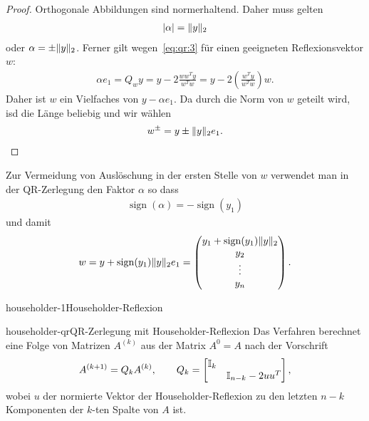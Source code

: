 \begin{proof}
  Orthogonale Abbildungen sind normerhaltend. Daher muss gelten
  \begin{gather}
    \lvert\alpha\rvert = \lVert y\rVert_2
  \end{gather}
  oder $\alpha = \pm\lVert y\rVert_2$.  Ferner gilt
  wegen~\eqref{eq:qr:3} für einen geeigneten Reflexionsvektor $w$:
  \begin{gather}
    \alpha e_1 = Q_{w} y = y-2 \frac{ww^Ty}{w^Tw}
    = y-2\left(\frac{w^Ty}{w^Tw}\right)w.
  \end{gather}
  Daher ist $w$ ein Vielfaches von $y - \alpha e_1$. Da durch die Norm
  von $w$ geteilt wird, isd die Länge beliebig und wir wählen
  \begin{gather}
    w^{\pm} = y\pm \lVert y\rVert_2 e_1.
  \end{gather}
\end{proof}

\begin{remark}
  Zur Vermeidung von Auslöschung in der ersten Stelle von $w$
  verwendet man in der QR-Zerlegung den Faktor $\alpha$ so dass
  \begin{gather}
    \operatorname{sign} (\alpha) = -\operatorname{sign} (y_1)
  \end{gather}
  und damit
  \begin{gather}
    w = y + \operatorname{sign} (y_1) \lVert y\rVert_2 e_1
    =
    \begin{pmatrix}
      y_1 + \operatorname{sign} (y_1) \lVert y\rVert_2\\
      y_2\\\vdots\\y_n
    \end{pmatrix}.
  \end{gather}
\end{remark}

\begin{Algorithmus*}{householder-1}{Householder-Reflexion}
  
\end{Algorithmus*}

\begin{Definition*}{householder-qr}{QR-Zerlegung mit Householder-Reflexion}
  Das Verfahren berechnet eine Folge von Matrizen $A^{(k)}$ aus der
  Matrix $A^{0} = A$ nach der Vorschrift
  \begin{gather}
    A^{(k+1)} = Q_{k} A^{(k)}, \qquad Q_k =
    \begin{bmatrix}
      \mathbb I_k\\& \mathbb I_{n-k}-2uu^T
    \end{bmatrix},
  \end{gather}
  wobei $u$ der normierte Vektor der Householder-Reflexion zu den letzten $n-k$
  Komponenten der $k$-ten Spalte von $A$ ist.
\end{Definition*}

